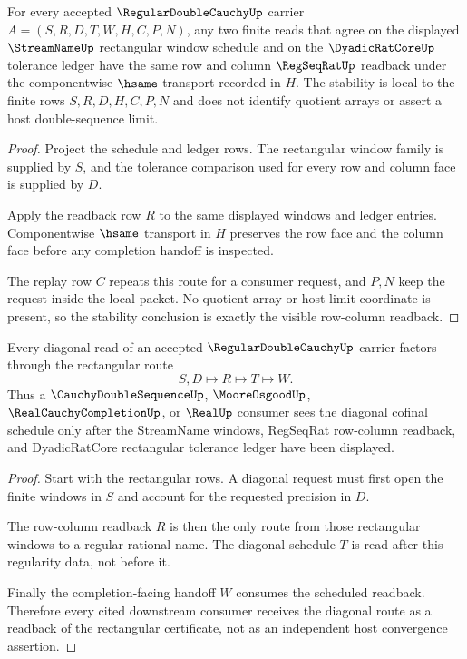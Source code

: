 \begin{theorem}
\label{thm:regular-double-cauchy-row-column-stability}
For every accepted $\RegularDoubleCauchyUp$ carrier $A=(S,R,D,T,W,H,C,P,N)$, any two finite reads that agree on the displayed $\StreamNameUp$ rectangular window schedule and on the $\DyadicRatCoreUp$ tolerance ledger have the same row and column $\RegSeqRatUp$ readback under the componentwise $\hsame$ transport recorded in $H$. The stability is local to the finite rows $S,R,D,H,C,P,N$ and does not identify quotient arrays or assert a host double-sequence limit.
\end{theorem}
\begin{proof}
Project the schedule and ledger rows. The rectangular window family is supplied by $S$, and the tolerance comparison used for every row and column face is supplied by $D$.

Apply the readback row $R$ to the same displayed windows and ledger entries. Componentwise $\hsame$ transport in $H$ preserves the row face and the column face before any completion handoff is inspected.

The replay row $C$ repeats this route for a consumer request, and $P,N$ keep the request inside the local packet. No quotient-array or host-limit coordinate is present, so the stability conclusion is exactly the visible row-column readback.
\end{proof}

\begin{theorem}
\label{thm:regular-double-cauchy-diagonal-readback}
Every diagonal read of an accepted $\RegularDoubleCauchyUp$ carrier factors through the rectangular route
$$
S,D \longmapsto R \longmapsto T \longmapsto W .
$$
Thus a $\CauchyDoubleSequenceUp$, $\MooreOsgoodUp$, $\RealCauchyCompletionUp$, or $\RealUp$ consumer sees the diagonal cofinal schedule only after the StreamName windows, RegSeqRat row-column readback, and DyadicRatCore rectangular tolerance ledger have been displayed.
\end{theorem}
\begin{proof}
Start with the rectangular rows. A diagonal request must first open the finite windows in $S$ and account for the requested precision in $D$.

The row-column readback $R$ is then the only route from those rectangular windows to a regular rational name. The diagonal schedule $T$ is read after this regularity data, not before it.

Finally the completion-facing handoff $W$ consumes the scheduled readback. Therefore every cited downstream consumer receives the diagonal route as a readback of the rectangular certificate, not as an independent host convergence assertion.
\end{proof}

